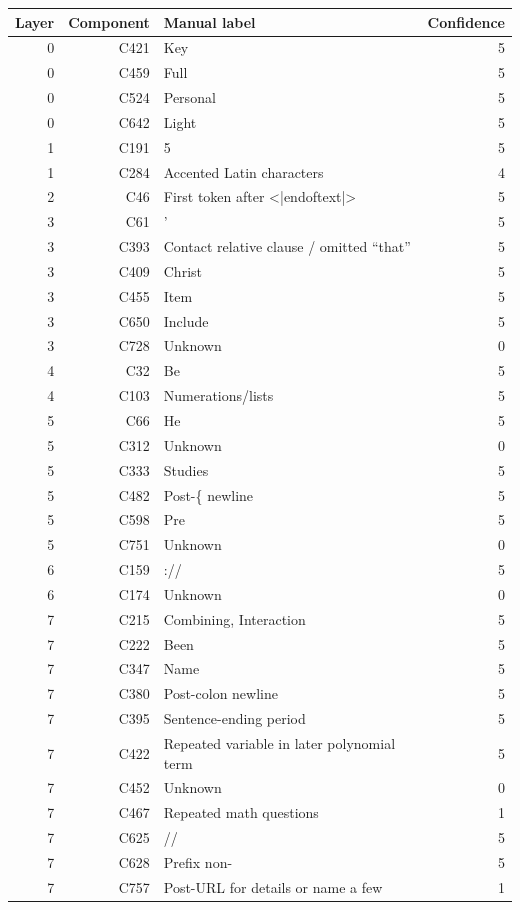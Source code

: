 \begin{tabular}{@{}rrp{}r@{}}
  \toprule
  Layer & Component & Manual label & Confidence \\
  \midrule
  0 & C421 & Key & 5 \\
  0 & C459 & Full & 5 \\
  0 & C524 & Personal & 5 \\
  0 & C642 & Light & 5 \\
  1 & C191 & 5 & 5 \\
  1 & C284 & Accented Latin characters & 4 \\
  2 & C46 & First token after <|endoftext|> & 5 \\
  3 & C61 & ' & 5 \\
  3 & C393 & Contact relative clause / omitted ``that'' & 5 \\
  3 & C409 & Christ & 5 \\
  3 & C455 & Item & 5 \\
  3 & C650 & Include & 5 \\
  3 & C728 & Unknown & 0 \\
  4 & C32 & Be & 5 \\
  4 & C103 & Numerations/lists & 5 \\
  5 & C66 & He & 5 \\
  5 & C312 & Unknown & 0 \\
  5 & C333 & Studies & 5 \\
  5 & C482 & Post-\{ newline & 5 \\
  5 & C598 & Pre & 5 \\
  5 & C751 & Unknown & 0 \\
  6 & C159 & :// & 5 \\
  6 & C174 & Unknown & 0 \\
  7 & C215 & Combining, Interaction & 5 \\
  7 & C222 & Been & 5 \\
  7 & C347 & Name & 5 \\
  7 & C380 & Post-colon newline & 5 \\
  7 & C395 & Sentence-ending period & 5 \\
  7 & C422 & Repeated variable in later polynomial term & 5 \\
  7 & C452 & Unknown & 0 \\
  7 & C467 & Repeated math questions & 1 \\
  7 & C625 & // & 5 \\
  7 & C628 & Prefix non- & 5 \\
  7 & C757 & Post-URL for details or name a few & 1 \\

\end{tabular}
